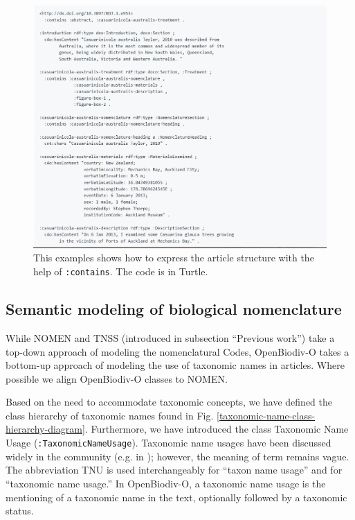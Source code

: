 \begin{figure}[h!]
  \centering
  \includegraphics[width=\textwidth]{Figures/example-article-structure}
  \decoRule
  \caption[Example article structure.]{This examples shows how to express the article structure with the help of {\tt :contains}. The code is in Turtle.}
  \label{example-article-structure}
\end{figure}


\subsection{Semantic modeling of biological nomenclature}

While NOMEN and TNSS (introduced in subsection ``Previous work'') take a top-down approach of modeling the nomenclatural Codes, OpenBiodiv-O takes a bottom-up approach of modeling the use of taxonomic names in articles. Where possible we align OpenBiodiv-O classes to NOMEN.

Based on the need to accommodate taxonomic concepts, we have defined the class hierarchy of taxonomic names found in Fig. \ref{taxonomic-name-class-hierarchy-diagram}. Furthermore, we have introduced the class Taxonomic Name Usage ({\tt :TaxonomicNameUsage}). Taxonomic name usages have been discussed widely in the community (e.g. in \cite{pyle_taxonomic_2016}); however, the meaning of term remains vague. The abbreviation TNU is used interchangeably for ``taxon name usage'' and for ``taxonomic name usage.'' In OpenBiodiv-O, a taxonomic name usage is the mentioning of a taxonomic name in the text, optionally followed by a taxonomic status.

